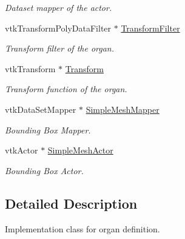 \begin{DoxyCompactItemize}
\begin{DoxyCompactList}\small\item\em Dataset mapper of the actor. \item\end{DoxyCompactList}\item 
\hypertarget{classvtkOrgan_a037f7ebec60977d740b505fd5173533c}{
vtkTransformPolyDataFilter $\ast$ \hyperlink{classvtkOrgan_a037f7ebec60977d740b505fd5173533c}{TransformFilter}}
\label{classvtkOrgan_a037f7ebec60977d740b505fd5173533c}

\begin{DoxyCompactList}\small\item\em Transform filter of the organ. \item\end{DoxyCompactList}\item 
\hypertarget{classvtkOrgan_aaea6ee1089523e2d8b8bf40b5db1ea6a}{
vtkTransform $\ast$ \hyperlink{classvtkOrgan_aaea6ee1089523e2d8b8bf40b5db1ea6a}{Transform}}
\label{classvtkOrgan_aaea6ee1089523e2d8b8bf40b5db1ea6a}

\begin{DoxyCompactList}\small\item\em Transform function of the organ. \item\end{DoxyCompactList}\item 
\hypertarget{classvtkOrgan_a7e81f7828374ebd3d4799defdaaed87a}{
vtkDataSetMapper $\ast$ \hyperlink{classvtkOrgan_a7e81f7828374ebd3d4799defdaaed87a}{SimpleMeshMapper}}
\label{classvtkOrgan_a7e81f7828374ebd3d4799defdaaed87a}

\begin{DoxyCompactList}\small\item\em Bounding Box Mapper. \item\end{DoxyCompactList}\item 
\hypertarget{classvtkOrgan_ae2258f7405bc1cb0dfa2622850306215}{
vtkActor $\ast$ \hyperlink{classvtkOrgan_ae2258f7405bc1cb0dfa2622850306215}{SimpleMeshActor}}
\label{classvtkOrgan_ae2258f7405bc1cb0dfa2622850306215}

\begin{DoxyCompactList}\small\item\em Bounding Box Actor. \item\end{DoxyCompactList}\end{DoxyCompactItemize}


\subsection{Detailed Description}
Implementation class for organ definition. 

